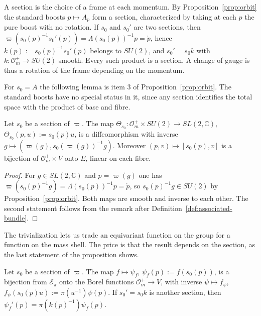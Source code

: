 \begin{remark}
	A section is the choice of a frame at each momentum. By Proposition~\ref{prop:orbit} the standard boosts $p\mapsto A_p$ form a section, characterized by taking at each $p$ the pure boost with no rotation. If $s_0$ and $s_0'$ are two sections, then $\varpi(s_0(p)^{-1}s_0'(p))=\Lambda(s_0(p))^{-1}p=\mathring{p}$, hence $k(p):=s_0(p)^{-1}s_0'(p)$ belongs to $SU(2)$, and $s_0'=s_0k$ with $k:\mathcal{O}_m^+\to SU(2)$ smooth. Every such product is a section. A change of gauge is thus a rotation of the frame depending on the momentum.
\end{remark}

For $s_0=A$ the following lemma is item 3 of Proposition~\ref{prop:orbit}. The standard boosts have no special status in it, since any section identifies the total space with the product of base and fibre.

\begin{lemma}[Trivialization]\label{lem:trivialization}
	Let $s_0$ be a section of $\varpi$. The map $\Theta_{s_0}:\mathcal{O}_m^+\times SU(2)\to SL(2,\mathbb{C})$, $\Theta_{s_0}(p,u):=s_0(p)u$, is a diffeomorphism with inverse $g\mapsto(\varpi(g),s_0(\varpi(g))^{-1}g)$. Moreover $(p,v)\mapsto[s_0(p),v]$ is a bijection of $\mathcal{O}_m^+\times V$ onto $E$, linear on each fibre.
\end{lemma}

\begin{proof}
	For $g\in SL(2,\mathbb{C})$ and $p=\varpi(g)$ one has $\varpi(s_0(p)^{-1}g)=\Lambda(s_0(p))^{-1}p=\mathring{p}$, so $s_0(p)^{-1}g\in SU(2)$ by Proposition~\ref{prop:orbit}. Both maps are smooth and inverse to each other. The second statement follows from the remark after Definition~\ref{def:associated-bundle}.
\end{proof}

The trivialization lets us trade an equivariant function on the group for a function on the mass shell. The price is that the result depends on the section, as the last statement of the proposition shows.

\begin{proposition}\label{prop:equivariant-base}
	Let $s_0$ be a section of $\varpi$. The map $f\mapsto\psi_f$, $\psi_f(p):=f(s_0(p))$, is a bijection from $\mathcal{E}_\pi$ onto the Borel functions $\mathcal{O}_m^+\to V$, with inverse $\psi\mapsto f_\psi$, $f_\psi(s_0(p)u):=\pi(u^{-1})\psi(p)$. If $s_0'=s_0k$ is another section, then $\psi_f'(p)=\pi(k(p)^{-1})\psi_f(p)$.
\end{proposition}

